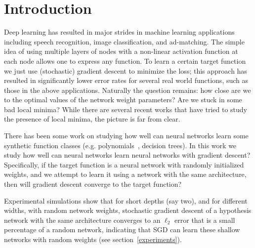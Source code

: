 \section{Introduction}


Deep learning has resulted in major strides in machine learning applications including speech recognition, image classification, and ad-matching. The simple idea of using multiple layers of nodes with a non-linear activation function at each node allows one to express any function.  To learn a certain target function we just use (stochastic) gradient descent to minimize the loss; this approach has resulted in significantly lower error rates for several real world functions, such as those in the above applications. Naturally the question remains: how close are we to the optimal values of the network weight parameters? Are we stuck in some bad local minima? While there are several recent works \cite{ChoromanskaHMAL14, DauphinPGCGB14, Kawaguchi16a} that have tried to study the presence of local minima, the picture is far from clear.

There has been some work on studying how well can neural networks learn some synthetic function classes (e.g. polynomials~\cite{valiant2014learning}, decision trees). 
In this work we study how well can neural networks learn neural networks with gradient descent?
%
%
 Specifically, if the target function is a neural network with randomly initialized weights, and we attempt to learn it using a network with the same architecture, then will gradient descent converge to the target function?





Experimental simulations show that for short depths (say two), and for different widths, with random network weights, stochastic gradient descent of a hypothesis network with the same architecture converges to an $\ell_2$ error that is a small percentage of a random network, indicating that SGD can learn these shallow networks with random weights (see section~\ref{experiments}). 

